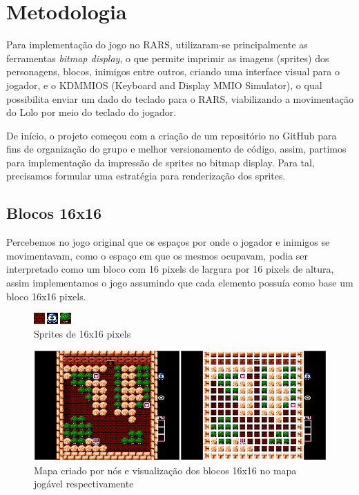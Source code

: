 \documentclass[10pt, conference, compsocconf]{IEEEtran}
\begin{document}
\section{Metodologia}{
\label{sec:Metodologia}

Para implementação do jogo no RARS, utilizaram-se principalmente as ferramentas
\textit{bitmap display}, o que permite imprimir as imagens (sprites) dos personagens,
blocos, inimigos entre outros, criando uma interface visual para o jogador, e o
KDMMIOS (Keyboard and Display MMIO Simulator), o qual possibilita enviar um dado
do teclado para o RARS, viabilizando a movimentação do Lolo por meio do teclado
do jogador.

De início, o projeto começou com a criação de um repositório no GitHub para fins
de organização do grupo e melhor versionamento de código, assim, partimos para
implementação da impressão de sprites no bitmap display. Para tal, precisamos
formular uma estratégia para renderização dos sprites.

\subsection{Blocos 16x16}{

Percebemos no jogo original que os espaços por onde
o jogador e inimigos se movimentavam, como o espaço
em que os mesmos ocupavam, podia ser interpretado
como um bloco com 16 pixels de largura por 16 pixels de altura, assim implementamos o jogo assumindo
que cada elemento possuía como base um bloco 16x16
pixels.


\begin{figure}[htb]
  \begin{center}
   \includegraphics[width=0.7\linewidth]{./Figures/image_2e3e4.png}
  \end{center}
  \caption{Sprites de 16x16 pixels}
\end{figure}

\begin{figure}[htb]
  \begin{center}
   \includegraphics[width=1\linewidth]{./Figures/maps_16_by_16.png}
  \end{center}
  \caption{Mapa criado por nós e visualização dos
blocos 16x16 no mapa jogável respectivamente}
  \label{fig:01}
\end{figure}

}}
\end{document}
